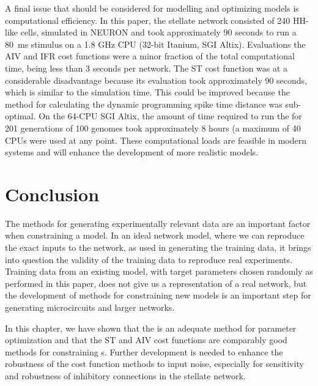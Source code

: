 A final issue that should be considered for modelling and optimizing {\BNN}
models is computational efficiency. In this paper, the {\CN} stellate network
consisted of 240 HH-like cells, simulated in NEURON and took approximately
90 seconds to run a 80~ms stimulus on a 1.8 GHz CPU (32-bit Itanium, SGI
Altix).  Evaluations the AIV and IFR cost functions were a minor fraction
of the total computational time, being less than 3 seconds per network. The
ST cost function was at a considerable disadvantage because its evaluation
took approximately 90 seconds, which is similar to the simulation
time. This could be improved because the method for calculating the dynamic
programming spike time distance was sub-optimal.  On the 64-CPU SGI Altix,
the amount of time required to run the {\GA} for 201 generations of 100
genomes took approximately 8 hours (a maximum of 40 CPUs were used at any
point.  These computational loads are feasible in modern systems and will
enhance the development of more realistic {\BNN} models.


\section{Conclusion}\label{sec:GA:conclusion}

The methods for generating experimentally relevant data are an important
factor when constraining a {\BNN} model. In an ideal network model, where we
can reproduce the exact inputs to the network, as used in generating the
training data, it brings into question the validity of the training data to
reproduce real experiments.  Training data from an existing model, with
target parameters chosen randomly as performed in this paper, does not give
us a representation of a real network, but the development of methods for
constraining new models is an important step for generating microcircuits
and larger networks.

\smallskip{}

In this chapter, we have shown that the {\GA} is an adequate method for
parameter optimization and that the ST and AIV cost functions are
comparably good methods for constraining {\BNN}s. Further development is
needed to enhance the robustness of the cost function methods to input
noise, especially for sensitivity and robustness of inhibitory connections
in the {\CN} stellate network.  


